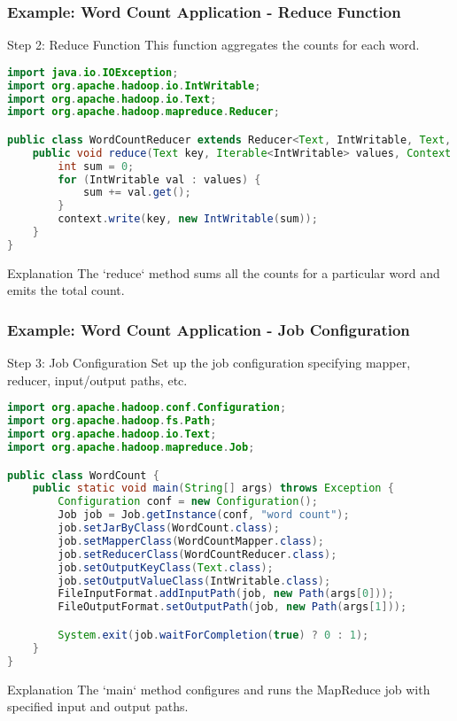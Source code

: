 \documentclass[aspectratio=169]{beamer}
\begin{document}
\begin{frame}[fragile]
    \frametitle{Example: Word Count Application - Reduce Function}
    \begin{block}{Step 2: Reduce Function}
        This function aggregates the counts for each word.
    \end{block}
    
    \begin{lstlisting}[language=Java]
import java.io.IOException;
import org.apache.hadoop.io.IntWritable;
import org.apache.hadoop.io.Text;
import org.apache.hadoop.mapreduce.Reducer;

public class WordCountReducer extends Reducer<Text, IntWritable, Text, IntWritable> {
    public void reduce(Text key, Iterable<IntWritable> values, Context context) throws IOException, InterruptedException {
        int sum = 0;
        for (IntWritable val : values) {
            sum += val.get();
        }
        context.write(key, new IntWritable(sum));
    }
}
    \end{lstlisting}
    
    \begin{block}{Explanation}
        The `reduce` method sums all the counts for a particular word and emits the total count.
    \end{block}
\end{frame}

\begin{frame}[fragile]
    \frametitle{Example: Word Count Application - Job Configuration}
    \begin{block}{Step 3: Job Configuration}
        Set up the job configuration specifying mapper, reducer, input/output paths, etc.
    \end{block}
    
    \begin{lstlisting}[language=Java]
import org.apache.hadoop.conf.Configuration;
import org.apache.hadoop.fs.Path;
import org.apache.hadoop.io.Text;
import org.apache.hadoop.mapreduce.Job;

public class WordCount {
    public static void main(String[] args) throws Exception {
        Configuration conf = new Configuration();
        Job job = Job.getInstance(conf, "word count");
        job.setJarByClass(WordCount.class);
        job.setMapperClass(WordCountMapper.class);
        job.setReducerClass(WordCountReducer.class);
        job.setOutputKeyClass(Text.class);
        job.setOutputValueClass(IntWritable.class);
        FileInputFormat.addInputPath(job, new Path(args[0]));
        FileOutputFormat.setOutputPath(job, new Path(args[1]));

        System.exit(job.waitForCompletion(true) ? 0 : 1);
    }
}
    \end{lstlisting}
    
    \begin{block}{Explanation}
        The `main` method configures and runs the MapReduce job with specified input and output paths.
    \end{block}
\end{frame}
\end{document}
